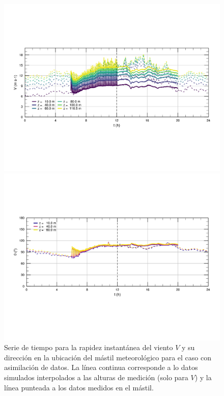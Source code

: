 \begin{figure}[H]
	\centering
	\includegraphics[width=1\linewidth,trim={9mm 63mm 10mm 55mm},clip]{Imagenes/06/hov_da/ts_v}%
	
	\includegraphics[width=1\linewidth,trim={12mm 55mm 10mm 55mm},clip]{Imagenes/06/hov_da/ts_o}%
	\caption{Serie de tiempo para la rapidez instantánea del viento $V$ y su dirección en la ubicación del mástil meteorológico para el caso con asimilación de datos. La línea continua corresponde a lo datos simulados interpolados a las alturas de medición (solo para $V$) y la línea punteada a los datos medidos en el mástil.}
	\label{fig:06_hov_da_ts}
\end{figure}



